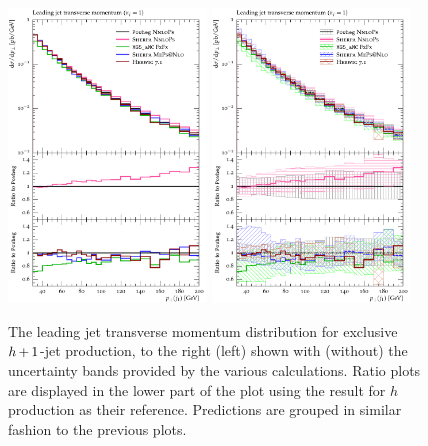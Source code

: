 \begin{figure}[t!]
  \centering
  \includegraphics[width=0.47\textwidth]{figures/hjetscomp_u_jet1_pT_excl.pdf}
  \hfill
  \includegraphics[width=0.47\textwidth]{figures/hjetscomp_jet1_pT_excl.pdf}
  \caption{\label{fig:hjetscomp:results:1obs:j1pt_excl}%
    The leading jet transverse momentum distribution for exclusive
    $h\!\text{~+~}\!1$-jet production, to the right (left) shown with (without)
    the uncertainty bands provided by the various calculations. Ratio
    plots are displayed in the lower part of the plot using the
    \Powheg \NNLOPS result for $h$ production as their reference.
    Predictions are grouped in similar fashion to the previous plots.}
\end{figure}


